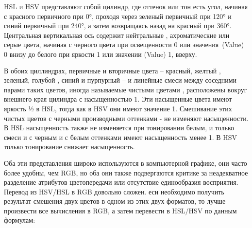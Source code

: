 HSL и HSV представляют собой цилиндр, где оттенок или тон есть угол, начиная с красного первичного при 0°, проходя через зеленый первичный при 120° и синий первичный при 240°, а затем возвращаясь назад на красный при 360°. Центральная вертикальная ось содержит нейтральные , ахроматические или серые цвета, начиная с черного цвета при освещенности 0 или значения (Value) 0 внизу до белого при яркости 1 или значении (Value) 1, вверху.

В обоих циллиндрах, первичные и вторичные цвета -- красный, желтый , зеленый, голубой , синий и пурпурный  -- и линейные смеси между соседними парами таких цветов, иногда называемые чистыми цветами , расположены вокруг внешнего края цилиндра с насыщенностью 1. Эти насыщенные цвета имеют яркость ½ в HSL, тогда как в HSV они имеют значение 1. Смешивание этих чистых цветов с черными  производными оттенками - не изменяют насыщенности. В HSL насыщенность также не изменяется при тонировании белым, и только смеси и с черным и с белым оттенками имеют насыщенность менее 1. В HSV только тонирование снижает насыщенность.

\begin{figure}[ht!]
\end{figure}


Оба эти представления широко используются в компьютерной графике, они часто более удобны, чем RGB, но оба они также подвергаются критике за неадекватное разделение атрибутов цветопередачи или отсутствие единообразия восприятия. Перевод из HSV/HSL в RGB довольно сложен. еси  необходимо получить результат смешения двух цветов в одном из этих двух форматов, то лучше произвести все вычисления в RGB, а затем перевести в HSL/HSV по данным формулам: 

